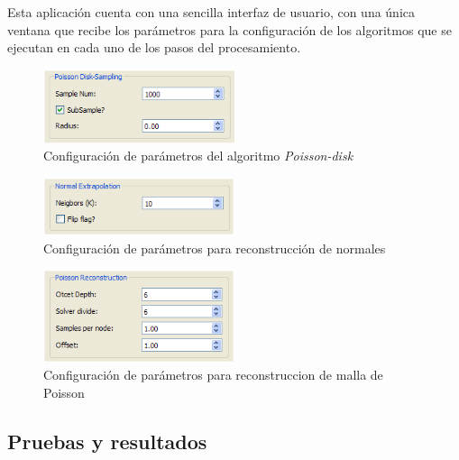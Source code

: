 Esta aplicación cuenta con una sencilla interfaz de usuario, con una única ventana que recibe los parámetros para la configuración de los algoritmos que se ejecutan en cada uno de los pasos del procesamiento.

\begin{figure}[H]
  \centering
    \includegraphics[width=0.5\textwidth]{./Cap2_videomapping/malla-poissongui.png}
  \caption{Configuración de parámetros del algoritmo \emph{Poisson-disk}}
  \label{fig:Mesh-PoissonGui}
\end{figure}

\begin{figure}[H]
  \centering
    \includegraphics[width=0.5\textwidth]{./Cap2_videomapping/malla-normalextrapolation.png}
  \caption{Configuración de parámetros para reconstrucción de normales}
  \label{fig:Mesh-Extrapolation}
\end{figure}

\begin{figure}[H]
  \centering
    \includegraphics[width=0.5\textwidth]{./Cap2_videomapping/malla-poissonreconstruction.png}
  \caption{Configuración de parámetros para reconstruccion de malla de Poisson}
  \label{fig:Mesh-Normals}
\end{figure}

\subsection{Pruebas y resultados}

